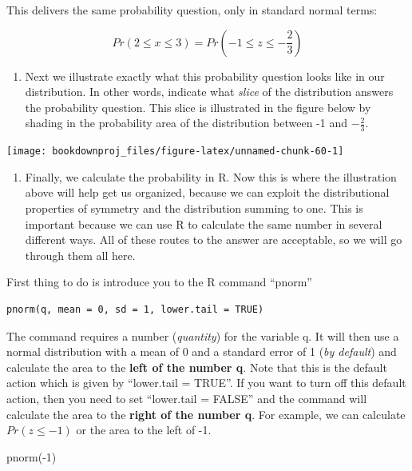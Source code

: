 \documentclass[
]{book}
\newenvironment{Shaded}{\begin{snugshade}}{\end{snugshade}}
\newcommand{\DecValTok}[1]{\textcolor[rgb]{0.00,0.00,0.81}{#1}}
\newcommand{\FunctionTok}[1]{\textcolor[rgb]{0.00,0.00,0.00}{#1}}
\newcommand{\NormalTok}[1]{#1}
\newcommand{\SpecialCharTok}[1]{\textcolor[rgb]{0.00,0.00,0.00}{#1}}
\providecommand{\tightlist}{%
  \setlength{\itemsep}{0pt}\setlength{\parskip}{0pt}}
\begin{document}
This delivers the same probability question, only in standard normal terms:

\[Pr(2 \leq x \leq 3)=Pr\left(-1 \leq z \leq -\frac{2}{3}\right)\]

\begin{enumerate}
\def\labelenumi{\arabic{enumi}.}
\setcounter{enumi}{1}
\tightlist
\item
  Next we illustrate exactly what this probability question looks like in our distribution. In other words, indicate what \emph{slice} of the distribution answers the probability question. This slice is illustrated in the figure below by shading in the probability area of the distribution between -1 and \(-\frac{2}{3}\).
\end{enumerate}

\begin{center}\texttt{[image: bookdownproj\_files/figure-latex/unnamed-chunk-60-1]} \end{center}

\begin{enumerate}
\def\labelenumi{\arabic{enumi}.}
\setcounter{enumi}{2}
\tightlist
\item
  Finally, we calculate the probability in R. Now this is where the illustration above will help get us organized, because we can exploit the distributional properties of symmetry and the distribution summing to one. This is important because we can use R to calculate the same number in several different ways. All of these routes to the answer are acceptable, so we will go through them all here.
\end{enumerate}

First thing to do is introduce you to the R command ``pnorm''

\begin{verbatim}
pnorm(q, mean = 0, sd = 1, lower.tail = TRUE)
\end{verbatim}

The command requires a number (\emph{quantity}) for the variable q. It will then use a normal distribution with a mean of 0 and a standard error of 1 (\emph{by default}) and calculate the area to the \textbf{left of the number q}. Note that this is the default action which is given by ``lower.tail = TRUE''. If you want to turn off this default action, then you need to set ``lower.tail = FALSE'' and the command will calculate the area to the \textbf{right of the number q}. For example, we can calculate \(Pr(z\leq-1)\) or the area to the left of -1.

\begin{Shaded}
\begin{Highlighting}[]
\FunctionTok{pnorm}\NormalTok{(}\SpecialCharTok{{-}}\DecValTok{1}\NormalTok{)}
\end{Highlighting}
\end{Shaded}
\end{document}
